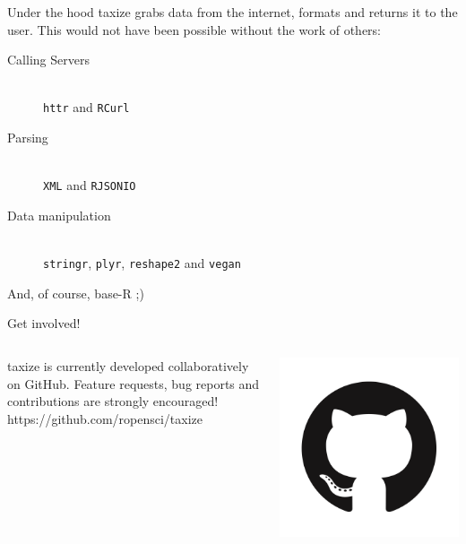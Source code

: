 \documentclass[final,t]{beamer}\usepackage[]{graphicx}\usepackage[]{color}
\begin{document}
\begin{frame}[fragile]
\begin{columns}[t]
\begin{column}{.49\linewidth}
      \begin{block}{Under the hood}
      taxize grabs data from the internet, formats and returns it to the user.
      This would not have been possible without the work of others:
      \begin{description}
        \item[Calling Servers] \hfill \\
          \texttt{httr} and \texttt{RCurl}
        \item[Parsing] \hfill \\
          \texttt{XML} and \texttt{RJSONIO}
        \item[Data manipulation] \hfill \\
          \texttt{stringr}, \texttt{plyr}, \texttt{reshape2} and \texttt{vegan}
      \end{description}
      \vspace{0.5cm}
      And, of course, base-R ;)
      
      \end{block}
      
			\begin{block}{Get involved!}
				\begin{columns}[T]
					\begin{column}{.78\linewidth}
						taxize is currently developed collaboratively on GitHub. Feature requests, bug reports and contributions are strongly encouraged! \\[0.5em]
						\huge \Mundus \normalsize \hspace{0.5cm} https://github.com/ropensci/taxize
					\end{column}
					\begin{column}{.2\linewidth}
						\includegraphics[width=0.85\linewidth]{fig/github.png}
					\end{column}
				\end{columns}
			\end{block}
      

\end{column}
\end{columns}
\end{frame}
\end{document}
